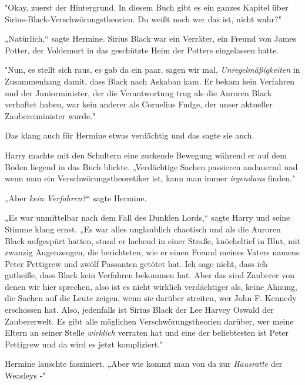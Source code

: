 {"Okay, zuerst der Hintergrund. In diesem Buch gibt es ein ganzes Kapitel über Sirius-Black-Verschwörungstheorien. Du weißt noch wer das ist, nicht wahr?"

„Natürlich,“ sagte Hermine. Sirius Black war ein Verräter, ein Freund von James Potter, der Voldemort in das geschützte Heim der Potters eingelassen hatte.

"Nun, es stellt sich raus, es gab da ein paar, sagen wir mal, \emph{Unregelmäßigkeiten} in Zusammenhang damit, dass Black nach Askaban kam. Er bekam kein Verfahren und der Juniorminister, der die Verantwortung trug als die Auroren Black verhaftet haben, war kein anderer als Cornelius Fudge, der unser aktueller Zaubereiminister wurde."

Das klang auch für Hermine etwas verdächtig und das sagte sie auch.

Harry machte mit den Schultern eine zuckende Bewegung während er auf dem Boden liegend in das Buch blickte. „Verdächtige Sachen passieren andauernd und wenn man ein Verschwörungstheoretiker ist, kann man immer \emph{irgendwas} finden."

„Aber \emph{kein Verfahren?}“ sagte Hermine.

„Es war unmittelbar nach dem Fall des Dunklen Lords,“ sagte Harry und seine Stimme klang ernst. „Es war alles unglaublich chaotisch und als die Auroren Black aufgespürt hatten, stand er lachend in einer Straße, knöcheltief in Blut, mit zwanzig Augenzeugen, die berichteten, wie er einen Freund meines Vaters namens Peter Pettigrew und zwölf Passanten getötet hat. Ich sage nicht, dass ich gutheiße, dass Black kein Verfahren bekommen hat. Aber das sind Zauberer von denen wir hier sprechen, also ist es nicht wirklich verdächtiger als, keine Ahnung, die Sachen auf die Leute zeigen, wenn sie darüber streiten, wer John F. Kennedy erschossen hat. Also, jedenfalls ist Sirius Black der Lee Harvey Oswald der Zaubererwelt. Es gibt alle möglichen Verschwörungstheorien darüber, wer meine Eltern an seiner Stelle \emph{wirklich} verraten hat und eine der beliebtesten ist Peter Pettigrew und da wird es jetzt kompliziert."

Hermine lauschte fasziniert. „Aber wie kommt man von da zur \emph{Hausratte} der Weasleys -"

}
